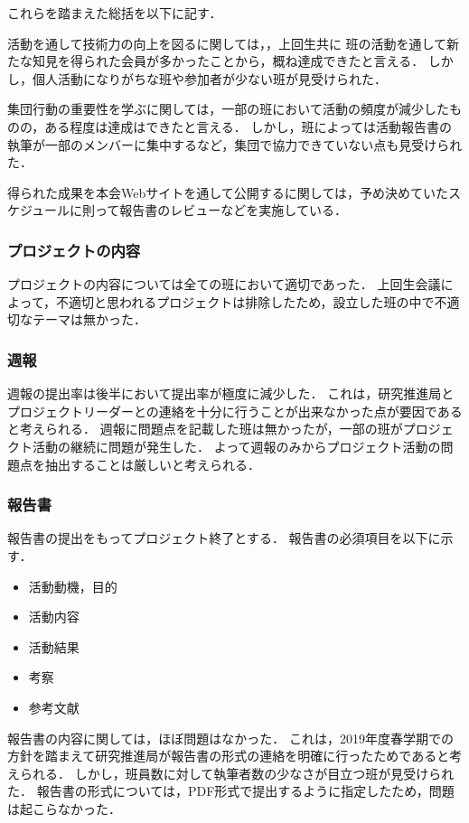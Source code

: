 これらを踏まえた総括を以下に記す．

活動を通して技術力の向上を図るに関しては，\firstGrade{}，上回生共に
班の活動を通して新たな知見を得られた会員が多かったことから，概ね達成できたと言える．
しかし，個人活動になりがちな班や参加者が少ない班が見受けられた．

集団行動の重要性を学ぶに関しては，一部の班において活動の頻度が減少したものの，ある程度は達成はできたと言える．
しかし，班によっては活動報告書の執筆が一部のメンバーに集中するなど，集団で協力できていない点も見受けられた．

得られた成果を本会Webサイトを通して公開するに関しては，予め決めていたスケジュールに則って報告書のレビューなどを実施している．

\subsubsection*{プロジェクトの内容}
プロジェクトの内容については全ての班において適切であった．
上回生会議によって，不適切と思われるプロジェクトは排除したため，設立した班の中で不適切なテーマは無かった．

\subsubsection*{週報}
週報の提出率は後半において提出率が極度に減少した．
これは，研究推進局とプロジェクトリーダーとの連絡を十分に行うことが出来なかった点が要因であると考えられる．
週報に問題点を記載した班は無かったが，一部の班がプロジェクト活動の継続に問題が発生した．
よって週報のみからプロジェクト活動の問題点を抽出することは厳しいと考えられる．

\subsubsection*{報告書}
報告書の提出をもってプロジェクト終了とする．
報告書の必須項目を以下に示す．

\begin{itemize}
\item 活動動機，目的
\item 活動内容
\item 活動結果
\item 考察
\item 参考文献
\end{itemize} 

報告書の内容に関しては，ほぼ問題はなかった．
これは，2019年度春学期での方針を踏まえて研究推進局が報告書の形式の連絡を明確に行ったためであると考えられる．
しかし，班員数に対して執筆者数の少なさが目立つ班が見受けられた．
報告書の形式については，PDF形式で提出するように指定したため，問題は起こらなかった．

